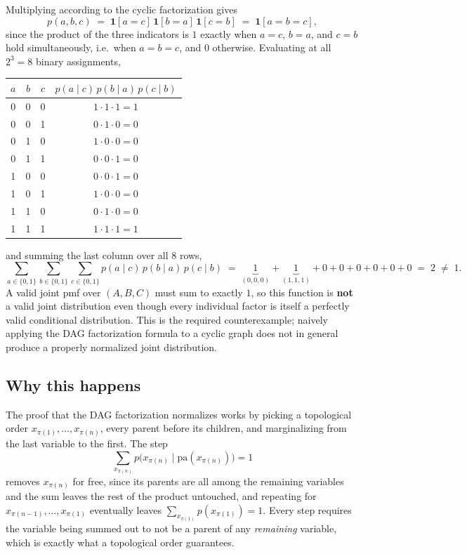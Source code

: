 \documentclass[11pt]{article}
\begin{document}
Multiplying according to the cyclic factorization gives
\[
  p(a,b,c) \;=\; \mathbf{1}[a=c]\,\mathbf{1}[b=a]\,\mathbf{1}[c=b]
  \;=\; \mathbf{1}[a=b=c],
\]
since the product of the three indicators is $1$ exactly when $a=c$, $b=a$, and
$c=b$ hold simultaneously, i.e.\ when $a=b=c$, and $0$ otherwise. Evaluating at
all $2^3 = 8$ binary assignments,

\begin{table}[h]
\centering
\begin{tabular}{ccc|c}
\toprule
$a$ & $b$ & $c$ & $p(a\mid c)\,p(b\mid a)\,p(c\mid b)$ \\
\midrule
0 & 0 & 0 & $1 \cdot 1 \cdot 1 = 1$ \\
0 & 0 & 1 & $0 \cdot 1 \cdot 0 = 0$ \\
0 & 1 & 0 & $1 \cdot 0 \cdot 0 = 0$ \\
0 & 1 & 1 & $0 \cdot 0 \cdot 1 = 0$ \\
1 & 0 & 0 & $0 \cdot 0 \cdot 1 = 0$ \\
1 & 0 & 1 & $1 \cdot 0 \cdot 0 = 0$ \\
1 & 1 & 0 & $0 \cdot 1 \cdot 0 = 0$ \\
1 & 1 & 1 & $1 \cdot 1 \cdot 1 = 1$ \\
\bottomrule
\end{tabular}
\end{table}

\noindent and summing the last column over all 8 rows,
\[
  \sum_{a\in\{0,1\}}\sum_{b\in\{0,1\}}\sum_{c\in\{0,1\}}
  p(a\mid c)\,p(b\mid a)\,p(c\mid b)
  \;=\; \underbrace{1}_{(0,0,0)} + \underbrace{1}_{(1,1,1)} + 0+0+0+0+0+0
  \;=\; 2 \;\neq\; 1.
\]
A valid joint pmf over $(A,B,C)$ must sum to exactly $1$, so this function is
\textbf{not} a valid joint distribution even though every individual factor is
itself a perfectly valid conditional distribution. This is the required
counterexample; naively applying the DAG factorization formula to a cyclic
graph does not in general produce a properly normalized joint distribution.

\subsection*{Why this happens}

The proof that the DAG factorization normalizes works by picking a topological
order $x_{\pi(1)}, \dots, x_{\pi(n)}$, every parent before its children, and
marginalizing from the last variable to the first. The step
\[
  \sum_{x_{\pi(n)}} p\big(x_{\pi(n)} \mid \mathrm{pa}(x_{\pi(n)})\big) = 1
\]
removes $x_{\pi(n)}$ for free, since its parents are all among the remaining
variables and the sum leaves the rest of the product untouched, and repeating
for $x_{\pi(n-1)}, \dots, x_{\pi(1)}$ eventually leaves
$\sum_{x_{\pi(1)}} p(x_{\pi(1)}) = 1$. Every step requires the variable being
summed out to not be a parent of any \emph{remaining} variable, which is exactly
what a topological order guarantees.
\end{document}
